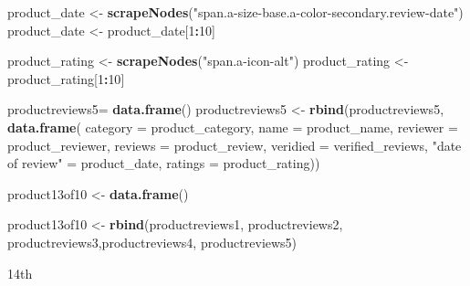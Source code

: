 \documentclass[
]{article}
\newenvironment{Shaded}{\begin{snugshade}}{\end{snugshade}}
\newcommand{\AttributeTok}[1]{\textcolor[rgb]{0.13,0.29,0.53}{#1}}
\newcommand{\DecValTok}[1]{\textcolor[rgb]{0.00,0.00,0.81}{#1}}
\newcommand{\FunctionTok}[1]{\textcolor[rgb]{0.13,0.29,0.53}{\textbf{#1}}}
\newcommand{\NormalTok}[1]{#1}
\newcommand{\OtherTok}[1]{\textcolor[rgb]{0.56,0.35,0.01}{#1}}
\newcommand{\SpecialCharTok}[1]{\textcolor[rgb]{0.81,0.36,0.00}{\textbf{#1}}}
\newcommand{\StringTok}[1]{\textcolor[rgb]{0.31,0.60,0.02}{#1}}
\begin{document}
\begin{Shaded}
\begin{Highlighting}[]
\NormalTok{  product\_date }\OtherTok{\textless{}{-}} \FunctionTok{scrapeNodes}\NormalTok{(}\StringTok{"span.a{-}size{-}base.a{-}color{-}secondary.review{-}date"}\NormalTok{)}
\NormalTok{  product\_date }\OtherTok{\textless{}{-}}\NormalTok{ product\_date[}\DecValTok{1}\SpecialCharTok{:}\DecValTok{10}\NormalTok{]}
  
\NormalTok{  product\_rating }\OtherTok{\textless{}{-}} \FunctionTok{scrapeNodes}\NormalTok{(}\StringTok{"span.a{-}icon{-}alt"}\NormalTok{)}
\NormalTok{  product\_rating }\OtherTok{\textless{}{-}}\NormalTok{ product\_rating[}\DecValTok{1}\SpecialCharTok{:}\DecValTok{10}\NormalTok{]}
  
\NormalTok{  productreviews5}\OtherTok{=} \FunctionTok{data.frame}\NormalTok{()}
\NormalTok{  productreviews5 }\OtherTok{\textless{}{-}} \FunctionTok{rbind}\NormalTok{(productreviews5, }\FunctionTok{data.frame}\NormalTok{(}
                      \AttributeTok{category =}\NormalTok{ product\_category,}
                      \AttributeTok{name =}\NormalTok{ product\_name,}
                      \AttributeTok{reviewer =}\NormalTok{ product\_reviewer,}
                      \AttributeTok{reviews =}\NormalTok{ product\_review,}
                      \AttributeTok{veridied =}\NormalTok{ verified\_reviews,}
                      \StringTok{"date of review"} \OtherTok{=}\NormalTok{ product\_date,}
                      \AttributeTok{ratings =}\NormalTok{ product\_rating))}
  
\NormalTok{  product13of10 }\OtherTok{\textless{}{-}} \FunctionTok{data.frame}\NormalTok{()}
  
\NormalTok{  product13of10 }\OtherTok{\textless{}{-}} \FunctionTok{rbind}\NormalTok{(productreviews1, productreviews2, productreviews3,productreviews4, productreviews5)}
\end{Highlighting}
\end{Shaded}

14th
\end{document}
